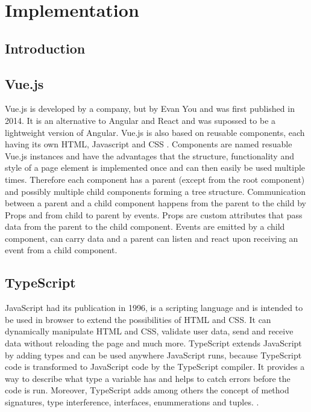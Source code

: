 \chapter{Implementation}

\section{Introduction}

\section{Vue.js}

Vue.js is developed by a company, but by Evan You and was first published in 2014. It is an alternative to Angular and React and was supossed to be a lightweight version of Angular. Vue.js is also based on reusable components, each having its own HTML, Javascript and CSS \cite{Vue}.
Components are named resuable Vue.js instances and have the advantages that the structure, functionality and style of a page element is implemented once and can then easily be used multiple times. Therefore each component has a parent (except from the root component) and possibly multiple child components forming a tree structure. Communication between a parent and a child component happens from the parent to the child by Props and from child to parent by events. Props are custom attributes that pass data from the parent to the child component. Events are emitted by a child component, can carry data and a parent can listen and react upon receiving an event from a child component.

\section{TypeScript}

JavaScript had its publication in 1996, is a scripting language and is intended to be used in browser to extend the possibilities of HTML and CSS. It can dynamically manipulate HTML and CSS, validate user data, send and receive data without reloading the page and much more.
TypeScript extends JavaScript by adding types and can be used anywhere JavaScript runs, because TypeScript code is transformed to JavaScript code by the TypeScript compiler. It provides a way to describe what type a variable has and helps to catch errors before the code is run. Moreover, TypeScript adds among others the concept of method signatures, type interference, interfaces, enummerations and tuples. \cite{Typescript}.

